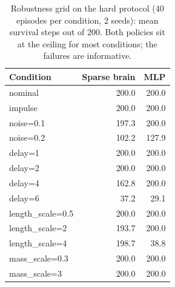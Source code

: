\begin{table}[t]
\centering
\small
\caption{Robustness grid on the hard protocol (40 episodes per condition, 2 seeds): mean survival steps out of 200. Both policies sit at the ceiling for most conditions; the failures are informative.}
\label{tab:robustness}
\begin{tabular}{lrr}
\toprule
Condition & Sparse brain & MLP \\
\midrule
nominal & 200.0 & 200.0 \\
impulse & 200.0 & 200.0 \\
noise=0.1 & 197.3 & 200.0 \\
noise=0.2 & 102.2 & 127.9 \\
delay=1 & 200.0 & 200.0 \\
delay=2 & 200.0 & 200.0 \\
delay=4 & 162.8 & 200.0 \\
delay=6 & 37.2 & 29.1 \\
length\_scale=0.5 & 200.0 & 200.0 \\
length\_scale=2 & 193.7 & 200.0 \\
length\_scale=4 & 198.7 & 38.8 \\
mass\_scale=0.3 & 200.0 & 200.0 \\
mass\_scale=3 & 200.0 & 200.0 \\
\bottomrule
\end{tabular}
\end{table}
